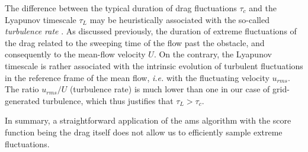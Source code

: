 \documentclass{jfm}
\newcommand{\EL}[1]{{\color{myred}{#1}}}
\begin{document}
The difference between the typical duration of drag fluctuations $\tau_c$ and the Lyapunov timescale $\tau_L$ may be heuristically associated with the so-called \emph{turbulence rate} \EL{\citep{frisch_book}}.
%
As discussed previously, the duration of extreme fluctuations of the drag \EL{is closely} related to the sweeping time of the flow past the obstacle, and consequently to the mean-flow velocity $U$. On the contrary, the Lyapunov timescale is rather associated with the intrinsic evolution of turbulent fluctuations in the reference frame of the mean flow, \textit{i.e.} with the fluctuating velocity $u_{rms}$. The ratio $u_{rms}/U$ (turbulence rate) is much lower than one in our case of grid-generated turbulence, which thus justifies that $\tau_L > \tau_c$.









%
In summary, a straightforward application of the \ac{ams} algorithm with the score function being the drag itself does not allow us to efficiently sample extreme fluctuations.
%
%
%
%
%
\EL{This behaviour is independent of the choice of $N$ and $T_a$. Increasing the size of the initial ensemble, or the duration of each trajectory, can only increase the amplitude of the global maximum reached initially, but does not solve the issue of overlapping trajectories.}
% 
\end{document}
